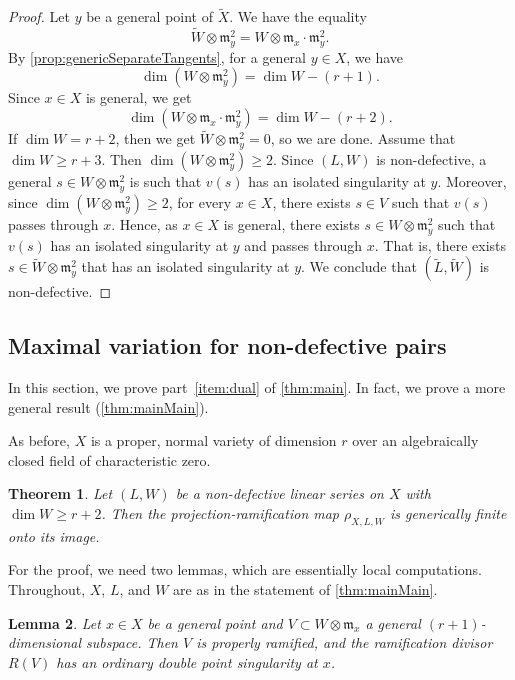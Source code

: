 \documentclass[11pt,reqno]{amsart}
\theoremstyle{plain}
\newtheorem{theorem}{Theorem}[section]
\newtheorem{lemma}[theorem]{Lemma}
\theoremstyle{definition}
\theoremstyle{remark}
\numberwithin{equation}{section}
\numberwithin{equation}{section}
\begin{document}
\begin{proof}
  Let $y$ be a general point of $\widetilde X$.
  We have the equality
  \[ \widetilde W \otimes \mathfrak m_y^2 = W \otimes \mathfrak m_x \cdot \mathfrak m_y^2. \]
  By \autoref{prop:genericSeparateTangents}, for a general $y \in X$, we have
  \[ \dim (W \otimes \mathfrak m_y^2) = \dim W - (r+1).\]
  Since $x \in X$ is general, we get
  \[ \dim (W \otimes \mathfrak m_x \cdot \mathfrak m_y^2) = \dim W - (r+2).\]
  If $\dim W = r+2$, then we get $\widetilde W \otimes \mathfrak m_y^2 = 0$, so we are done.
  Assume that $\dim W \geq r+3$.
  Then $\dim (W \otimes \mathfrak m_y^2) \geq 2$.
  Since $(L, W)$ is non-defective, a general $s \in W \otimes \mathfrak m_y^2$ is such that $v(s)$ has an isolated singularity at $y$.
  Moreover, since $\dim (W \otimes \mathfrak m_y^2) \geq 2$, for every $x \in X$, there exists $s \in V$ such that $v(s)$ passes through $x$.
  Hence, as $x \in X$ is general, there exists $s \in W \otimes \mathfrak m_y^2$ such that $v(s)$ has an isolated singularity at $y$ and passes through $x$.
  That is, there exists $s \in \widetilde W \otimes \mathfrak m_y^2 $ that has an isolated singularity at $y$.
  We conclude that $(\widetilde L, \widetilde W)$ is non-defective.
\end{proof}



\subsection{Maximal variation for non-defective pairs}

In this section, we prove part~\eqref{item:dual} of \autoref{thm:main}.
In fact, we prove a more general result (\autoref{thm:mainMain}).

As before, $X$ is a proper, normal variety of dimension $r$ over an algebraically closed field of characteristic zero.
\begin{theorem}
  \label{thm:mainMain}
  Let $(L, W)$ be a non-defective linear series on $X$ with $\dim W \geq r+2$.
  Then the projection-ramification map $\rho_{X,L,W}$ is generically finite onto its image.
\end{theorem}

For the proof, we need two lemmas, which are essentially local computations.
Throughout, $X$, $L$, and $W$ are as in the statement of \autoref{thm:mainMain}.

\begin{lemma}\label{lemma:tangentconeRam}
  Let $x \in X$ be a general point and $V \subset W \otimes \mathfrak m_x$ a general $(r+1)$-dimensional subspace.
  Then $V$ is properly ramified, and the ramification divisor $R(V)$ has an ordinary double point singularity at $x$.
\end{lemma}
\end{document}
